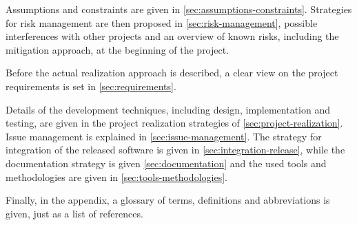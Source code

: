 Assumptions and constraints are given in \autoref{sec:assumptions-constraints}.
Strategies for risk management are then proposed in \autoref{sec:risk-management}, possible interferences with other projects and an overview of known risks, including the mitigation approach, at the beginning of the project.

Before the actual realization approach is described, a clear view on the project requirements is set in  \autoref{sec:requirements}.

Details of the development techniques, including design, implementation and testing, are given in the project realization strategies of \autoref{sec:project-realization}.
Issue management is explained in \autoref{sec:issue-management}.
The strategy for integration of the released software is given in \autoref{sec:integration-release}, while the documentation strategy is given \autoref{sec:documentation} and the used tools and methodologies are given in \autoref{sec:tools-methodologies}.

Finally, in the appendix, a glossary of terms, definitions and abbreviations is given, just as a list of references.
